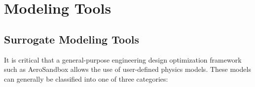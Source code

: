 \chapter{Modeling Tools}
\label{chapter:modeling}


%


\section{Surrogate Modeling Tools}
\label{sect:surrogate}

It is critical that a general-purpose engineering design optimization framework such as AeroSandbox allows the use of user-defined physics models. These models can generally be classified into one of three categories:

